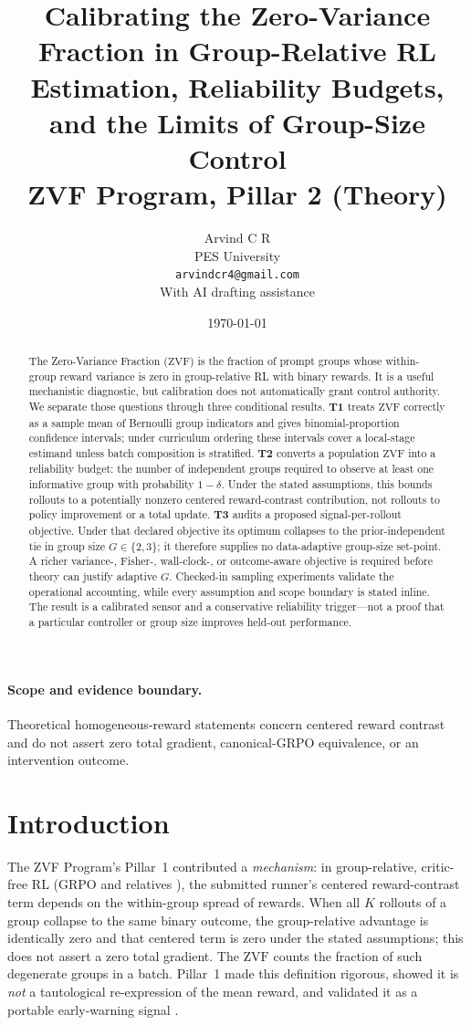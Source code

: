 \documentclass[11pt]{article}
\title{\textbf{Calibrating the Zero-Variance Fraction in Group-Relative RL}\\[4pt]
\large Estimation, Reliability Budgets, and the Limits of Group-Size Control\\[4pt]
\large ZVF Program, Pillar 2 (Theory)}
\author{Arvind C R\\PES University\\\texttt{arvindcr4@gmail.com}\\[2pt]
\small With AI drafting assistance}
\date{\today}
\theoremstyle{plain}
\theoremstyle{definition}
\theoremstyle{remark}
\newcommand{\ZVF}{\ensuremath{\mathrm{ZVF}}}
\newcommand{\1}{\mathbb{1}}
\begin{document}
\maketitle

\begin{abstract}
The Zero-Variance Fraction (\ZVF{}) is the fraction of prompt groups whose
within-group reward variance is zero in group-relative RL with binary rewards.
It is a useful mechanistic diagnostic, but calibration does not automatically
grant control authority. We separate those questions through three conditional
results. \textbf{T1} treats \ZVF{} correctly as a sample mean of Bernoulli group
indicators and gives binomial-proportion confidence intervals; under curriculum
ordering these intervals cover a local-stage estimand unless batch composition is
stratified. \textbf{T2} converts a population \ZVF{} into a reliability budget:
the number of independent groups required to observe at least one informative
group with probability $1-\delta$. Under the stated assumptions, this bounds
rollouts to a potentially nonzero centered reward-contrast contribution, not
rollouts to policy improvement or a total update. \textbf{T3} audits a
proposed signal-per-rollout objective. Under that declared objective its optimum
collapses to the prior-independent tie in group size $G\in\{2,3\}$; it therefore supplies no
data-adaptive group-size set-point. A richer variance-, Fisher-, wall-clock-, or
outcome-aware objective is required before theory can justify adaptive $G$.
Checked-in sampling experiments validate the operational accounting, while every
assumption and scope boundary is stated inline. The result is a calibrated sensor and a
conservative reliability trigger---not a proof that a particular controller or
group size improves held-out performance.
\end{abstract}
\paragraph{Scope and evidence boundary.} Theoretical homogeneous-reward
statements concern centered reward contrast and do not assert zero total
gradient, canonical-GRPO equivalence, or an intervention outcome.

\section{Introduction}
The ZVF Program's Pillar~1 contributed a \emph{mechanism}: in group-relative,
critic-free RL (GRPO and relatives \cite{shao2024deepseekmath}), the submitted
runner's centered reward-contrast term depends on the within-group spread of rewards.
When all $K$ rollouts of a group collapse to the same binary outcome, the
group-relative advantage is identically zero and that centered term is zero under
the stated assumptions; this does not assert a zero total gradient. The \ZVF{}
counts the fraction of such degenerate groups in a batch.
Pillar~1 made this definition rigorous, showed it is \emph{not} a tautological
re-expression of the mean reward, and validated it as a portable early-warning
signal \cite{zvfaudit2026}.
\end{document}
